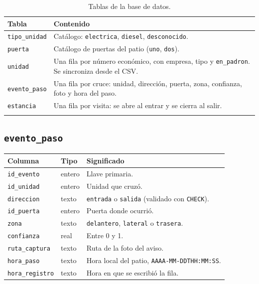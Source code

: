 \begin{longtable}{@{}L{3.6cm}L{10.6cm}@{}}
  \toprule
  \textbf{Tabla} & \textbf{Contenido} \\
  \midrule
  \endhead
  \texttt{tipo\_unidad} & Catálogo: \texttt{electrica}, \texttt{diesel},
    \texttt{desconocido}. \\
  \texttt{puerta} & Catálogo de puertas del patio (\texttt{uno},
    \texttt{dos}). \\
  \texttt{unidad} & Una fila por número económico, con empresa, tipo y
    \texttt{en\_padron}. Se sincroniza desde el CSV. \\
  \texttt{evento\_paso} & Una fila por cruce: unidad, dirección, puerta, zona,
    confianza, foto y hora del paso. \\
  \texttt{estancia} & Una fila por visita: se abre al entrar y se cierra al
    salir. \\
  \bottomrule
  \caption{Tablas de la base de datos.}
  \label{tab:tablas}
\end{longtable}

\subsection{\texttt{evento\_paso}}

\begin{center}
\begin{tabular}{@{}llp{7.6cm}@{}}
  \toprule
  \textbf{Columna} & \textbf{Tipo} & \textbf{Significado} \\
  \midrule
  \texttt{id\_evento}     & entero  & Llave primaria. \\
  \texttt{id\_unidad}     & entero  & Unidad que cruzó. \\
  \texttt{direccion}      & texto   & \texttt{entrada} o \texttt{salida}
                                        (validado con \texttt{CHECK}). \\
  \texttt{id\_puerta}     & entero  & Puerta donde ocurrió. \\
  \texttt{zona}           & texto   & \texttt{delantero}, \texttt{lateral} o
                                        \texttt{trasera}. \\
  \texttt{confianza}      & real    & Entre 0 y 1. \\
  \texttt{ruta\_captura}  & texto   & Ruta de la foto del aviso. \\
  \texttt{hora\_paso}     & texto   & Hora local del patio,
                                        \texttt{AAAA-MM-DDTHH:MM:SS}. \\
  \texttt{hora\_registro} & texto   & Hora en que se escribió la fila. \\
  \bottomrule
\end{tabular}
\end{center}

